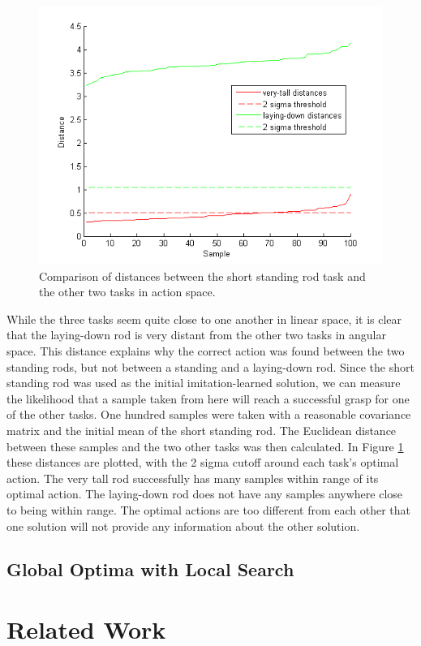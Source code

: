 \documentclass[12pt]{article}
\begin{document}
\begin{figure}[ht]
  \centering
  \includegraphics[width=0.8\columnwidth]{distance.png}
  \caption{\label{fig_distance} Comparison of distances between the short standing rod task and the other two tasks in action space.}
  \label{fig:distance}
\end{figure}

\newpage
While the three tasks seem quite close to one another in linear space, it is clear that the laying-down rod is very distant from the other two tasks in angular space. This distance explains why the correct action was found between the two standing rods, but not between a standing and a laying-down rod. Since the short standing rod was used as the initial imitation-learned solution, we can measure the likelihood that a sample taken from here will reach a successful grasp for one of the other tasks. One hundred samples were taken with a reasonable covariance matrix and the initial mean of the short standing rod. The Euclidean distance between these samples and the two other tasks was then calculated. In Figure \ref{fig:distance} these distances are plotted, with the 2 sigma cutoff around each task's optimal action. The very tall rod successfully has many samples within range of its optimal action. The laying-down rod does not have any samples anywhere close to being within range. The optimal actions are too different from each other that one solution will not provide any information about the other solution.

\subsection{Global Optima with Local Search}


\section{Related Work}
\end{document}
